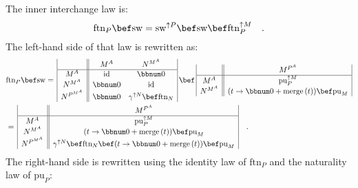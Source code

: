The inner interchange law is:
\[
\text{ftn}_{P}\bef\text{sw}=\text{sw}^{\uparrow P}\bef\text{sw}\bef\text{ftn}_{P}^{\uparrow M}\quad.
\]
The left-hand side of that law is rewritten as:
\begin{align*}
 & \text{ftn}_{P}\bef\text{sw}=\,\begin{array}{|c||cc|}
 & M^{A} & N^{M^{A}}\\
\hline M^{A} & \text{id} & \bbnum 0\\
N^{M^{A}} & \bbnum 0 & \text{id}\\
N^{P^{M^{A}}} & \bbnum 0 & \gamma^{\uparrow N}\bef\text{ftn}_{N}
\end{array}\,\bef\,\begin{array}{|c||c|}
 & M^{P^{A}}\\
\hline M^{A} & \text{pu}_{P}^{\uparrow M}\\
N^{M^{A}} & (t\rightarrow\bbnum 0+\text{merge}\,(t))\bef\text{pu}_{M}
\end{array}\\
 & =\,\begin{array}{|c||c|}
 & M^{P^{A}}\\
\hline M^{A} & \text{pu}_{P}^{\uparrow M}\\
N^{M^{A}} & (t\rightarrow\bbnum 0+\text{merge}\,(t))\bef\text{pu}_{M}\\
N^{P^{M^{A}}} & \gamma^{\uparrow N}\bef\text{ftn}_{N}\bef(t\rightarrow\bbnum 0+\text{merge}\,(t))\bef\text{pu}_{M}
\end{array}\quad.
\end{align*}
The right-hand side is rewritten using the identity law of $\text{ftn}_{P}$
and the naturality law of $\text{pu}_{P}$:
